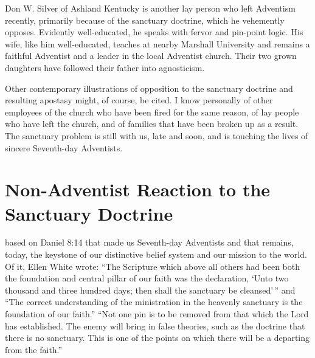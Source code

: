 Don W. Silver of Ashland Kentucky is another lay person who left Adventism
recently, primarily because of the sanctuary doctrine, which he vehemently
opposes. Evidently well-educated, he speaks with fervor and pin-point logic.
His wife, like him well-educated, teaches at nearby Marshall University and
remains a faithful Adventist and a leader in the local Adventist church.
Their two grown daughters have followed their father into
agnosticism.

Other contemporary illustrations of opposition to the sanctuary doctrine and
resulting apostasy might, of course, be cited. I know personally of other
employees of the church who have been fired for the same reason, of lay
people who have left the church, and of families that have been broken up as
a result. The sanctuary problem is still with us, late and soon, and is
touching the lives of sincere Seventh-day Adventists. 

\chapter{Non-Adventist Reaction to the Sanctuary Doctrine}
\label{ch:non-sda}

 based on Daniel 8:14 that made us Seventh-day
Adventists and that remains, today, the keystone of our distinctive belief
system and our mission to the world. Of it, Ellen White wrote: ``The
Scripture which above all others had been both the foundation and central 
pillar of our faith was the declaration, `Unto two thousand and three
hundred days; then shall the sanctuary be cleansed'\,''\cite{8} and ``The correct
understanding of the ministration in the heavenly sanctuary is the
foundation of our faith.'' ``Not one pin is to be removed from that which the
Lord has established. The enemy will bring in false theories, such as the
doctrine that there is no sanctuary. This is one of the points on which
there will be a departing from the faith.''\cite{31}

